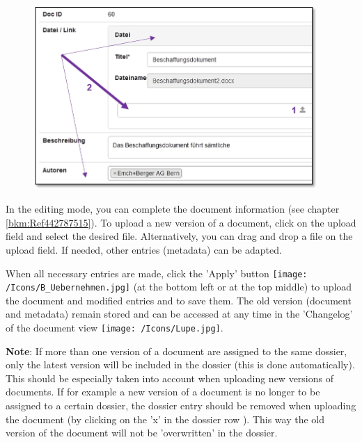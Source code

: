 \begin{figure}
\vspace{-10pt}
\includegraphics[height=70mm]{../chapters/11_Dokumentenablage/pictures/11-2-5_NeuesDokuHochladen.jpg}
\end{figure}
In the editing mode, you can complete the document information (see chapter \ref{bkm:Ref442787515}). To upload a new version of a document, click on the upload field  and select the desired file. Alternatively, you can drag and drop a file on the upload field. If needed, other entries (metadata) can be adapted.

\vspace{\baselineskip}

When all necessary entries are made, click the 'Apply' button \texttt{[image: /Icons/B\_Uebernehmen.jpg]} (at the bottom left or at the top middle) to upload the document and modified entries and to save them. The old version (document and metadata) remain stored and can be accessed at any time in the 'Changelog' of the document view \texttt{[image: /Icons/Lupe.jpg]}.

\vspace{\baselineskip}
\vspace{\baselineskip}

\textbf{Note}: If more than one version of a document are assigned to the same dossier, only the latest version will be included in the dossier (this is done automatically). This should be especially taken into account when uploading new versions of documents. If for example a new version of a document is no longer to be assigned to a certain dossier, the dossier entry should be removed when uploading the document (by clicking on the 'x' in the dossier row ). This way the old version of the document will not be 'overwritten' in the dossier.  

